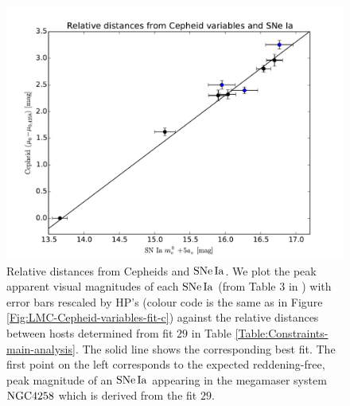 \begin{figure}[hbtp]
\centering
\includegraphics[scale=0.75]{figures/chapter-h0/effective_HP_SNIa.pdf}
\caption{Relative distances from Cepheids and $\mathrm{SNe\,Ia}$. We plot the peak apparent visual magnitudes of each $\mathrm{SNe\,Ia}$ (from Table 3 in \cite{Riess:2011yx}) with error bars rescaled by HP's (colour code is the same as in Figure \ref{Fig:LMC-Cepheid-variables-fit-c}) against the relative distances between hosts determined from fit $29$ in Table \ref{Table:Constraints-main-analysis}. The solid line shows the corresponding best fit. The first point on the left corresponds to the expected reddening-free, peak magnitude of an $\mathrm{SNe\,Ia}$ appearing in the megamaser system $\mathrm{NGC4258}$ which is derived from the fit $29$. }
\label{Fig:HP-SNIa-main-analysis}
\end{figure}


